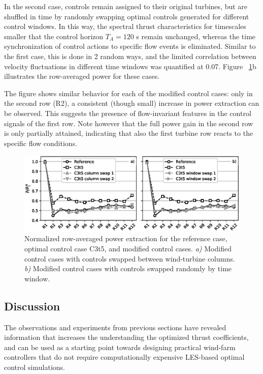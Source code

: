 \documentclass[wes, manuscript]{copernicus}
\newcommand{\revision}[1]{{\color{blue} #1}}
\begin{document}
In the second case, controls remain assigned to their original turbines, but are shuffled in time by randomly swapping optimal controls generated for different control windows. In this way, the spectral thrust characteristics for timescales smaller that the control horizon $T_A = 120$ s remain unchanged, whereas the time synchronization of control actions to specific flow events is eliminated. Similar to the first case, this is done in 2 random ways, \revision{and the limited correlation between velocity fluctuations in different time windows was quantified at 0.07}. Figure ~\ref{fig:scrambled}b illustrates the row-averaged power for these cases.

The figure shows similar behavior for each of the modified control cases: only in the second row (R2), a consistent (though small) increase in power extraction can be observed. This suggests the presence of flow-invariant	features in the control signals of the first row. Note however that the full power gain in the second row is only partially attained, indicating that also the first turbine row reacts to the specific flow conditions.  

\begin{figure}
	\includegraphics[width=\textwidth]{figure11}
	\caption{Normalized row-averaged power extraction for the reference case, optimal control case C3t5, and modified control cases. \emph{a)} Modified control cases with controls swapped between wind-turbine columns. \emph{b)} Modified control cases with controls swapped randomly by time window. \label{fig:scrambled}}
\end{figure}

\subsection{Discussion}\label{sec:analysis_discussion}

The observations and experiments from previous sections have revealed information that increases the understanding the optimized thrust coefficients, and can be used as a starting point towards designing practical wind-farm controllers that do not require computationally expensive LES-based optimal control simulations. 
\end{document}

